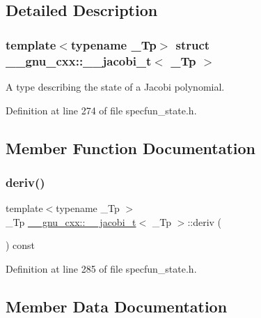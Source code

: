 \subsection{Detailed Description}
\subsubsection*{template$<$typename \+\_\+\+Tp$>$\newline
struct \+\_\+\+\_\+gnu\+\_\+cxx\+::\+\_\+\+\_\+jacobi\+\_\+t$<$ \+\_\+\+Tp $>$}

A type describing the state of a Jacobi polynomial. 

Definition at line 274 of file specfun\+\_\+state.\+h.



\subsection{Member Function Documentation}
\mbox{\label{struct____gnu__cxx_1_1____jacobi__t_a2b1a1fc42308cb293dfcb1fa4a8202a6}} 
\subsubsection{\texorpdfstring{deriv()}{deriv()}}
{\footnotesize\ttfamily template$<$typename \+\_\+\+Tp $>$ \\
\+\_\+\+Tp \hyperlink{struct____gnu__cxx_1_1____jacobi__t}{\+\_\+\+\_\+gnu\+\_\+cxx\+::\+\_\+\+\_\+jacobi\+\_\+t}$<$ \+\_\+\+Tp $>$\+::deriv (\begin{DoxyParamCaption}{ }\end{DoxyParamCaption}) const\hspace{0.3cm}{\ttfamily [inline]}}



Definition at line 285 of file specfun\+\_\+state.\+h.



\subsection{Member Data Documentation}
\mbox{\label{struct____gnu__cxx_1_1____jacobi__t_ab81da2815aa171345bf3893855b8c9a6}} 
